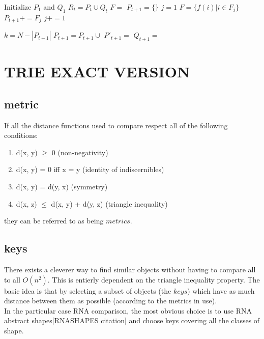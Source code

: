 \documentclass[a4paper, 12pt] {article}
\begin{document}
\begin{algorithmic}
  \State Initialize $P_1$ and $Q_1$
    \State $R_t = P_t \cup Q_t$
    \State $F = $ 
    \State $P_{t+1} = \{\}$
    \State $j = 1$
      \State $F =\{f(i) | i \in F_j\}$
      \State {}
      \State $P_{t+1} += F_j$
      \State $j+=1$
    \EndWhile
    
    \State $k = N - |P_{t+1}|$
    \State $P_{t+1} = P_{t+1} \cup$ 
    \State $P'_{t+1} =$ 
    \State $Q_{t+1} =$ 
  \EndFor
  \EndProcedure
\end{algorithmic}


\section*{TRIE EXACT VERSION}
\subsection*{metric}
If all the distance functions used to compare respect all of the following conditions:
\begin{enumerate}
  \item d(x, y) $\geq$ 0 (non-negativity)
  \item d(x, y) = 0 iff x = y (identity of indiscernibles)
  \item d(x, y) = d(y, x) (symmetry)
  \item d(x, z) $\leq$ d(x, y) + d(y, z) (triangle inequality)
\end{enumerate}\noindent
they can be referred to as being $metrics$. 
\subsection*{keys}
There exists a cleverer way to find similar objects without having to compare all to all
$O(n^2)$. This is entierly dependent on the triangle inequality property. The basic idea 
is that by selecting a subset of objects (the $keys$) which have as much distance between them as possible (according
to the metrics in use).\\ \noindent
In the particular case RNA comparison, the most obvious choice is to use RNA abstract shapes[RNASHAPES citation]
and choose keys covering all the classes of shape.
\end{document}

